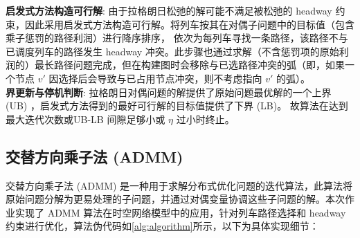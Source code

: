 \documentclass{article}
\begin{document}
    \textbf{启发式方法构造可行解}:
    由于拉格朗日松弛的解可能不满足被松弛的 headway 约束，因此采用启发式方法构造可行解。将列车按其在对偶子问题中的目标值（包含乘子惩罚的路径利润）进行降序排序，
    依次为每列车寻找一条路径，该路径不与已调度列车的路径发生 headway 冲突。此步骤也通过求解（不含惩罚项的原始利润的）最长路径问题完成，但在构建图时会移除与已选路径冲突的弧（即，如果一个节点
    $v'$ 因选择后会导致与已占用节点冲突，则不考虑指向 $v'$ 的弧）。\\
    \textbf{界更新与停机判断}:
    拉格朗日对偶问题的解提供了原始问题最优解的一个上界 (UB) ，启发式方法得到的最好可行解的目标值提供了下界 (LB)。
    故算法在达到最大迭代次数或UB-LB 间隙足够小或 $\eta$ 过小时终止。

    \subsection{交替方向乘子法 (ADMM)}
    交替方向乘子法 (ADMM)
    是一种用于求解分布式优化问题的迭代算法，此算法将原始问题分解为更易处理的子问题，并通过对偶变量协调这些子问题的解。本次作业实现了 ADMM
    算法在时空网络模型中的应用，针对列车路径选择和 headway 约束进行优化，算法伪代码如\ref{alg:algorithm}所示，以下为具体实现细节：
\end{document}
